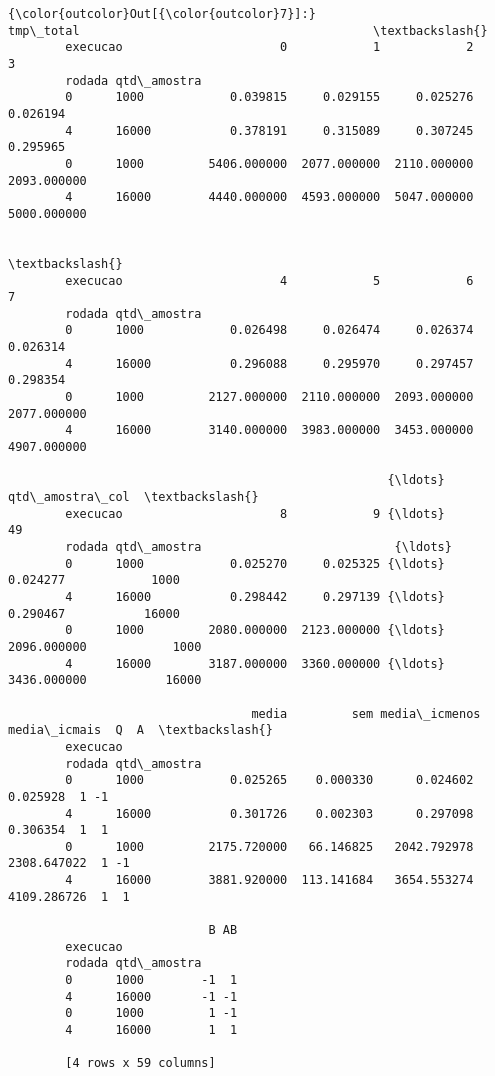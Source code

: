 \documentclass[11pt]{article}
\begin{document}
\begin{Verbatim}[commandchars=\\\{\}]
{\color{outcolor}Out[{\color{outcolor}7}]:}                       tmp\_total                                         \textbackslash{}
        execucao                      0            1            2            3   
        rodada qtd\_amostra                                                       
        0      1000            0.039815     0.029155     0.025276     0.026194   
        4      16000           0.378191     0.315089     0.307245     0.295965   
        0      1000         5406.000000  2077.000000  2110.000000  2093.000000   
        4      16000        4440.000000  4593.000000  5047.000000  5000.000000   
        
                                                                                \textbackslash{}
        execucao                      4            5            6            7   
        rodada qtd\_amostra                                                       
        0      1000            0.026498     0.026474     0.026374     0.026314   
        4      16000           0.296088     0.295970     0.297457     0.298354   
        0      1000         2127.000000  2110.000000  2093.000000  2077.000000   
        4      16000        3140.000000  3983.000000  3453.000000  4907.000000   
        
                                                     {\ldots}              qtd\_amostra\_col  \textbackslash{}
        execucao                      8            9 {\ldots}           49                   
        rodada qtd\_amostra                           {\ldots}                                
        0      1000            0.025270     0.025325 {\ldots}     0.024277            1000   
        4      16000           0.298442     0.297139 {\ldots}     0.290467           16000   
        0      1000         2080.000000  2123.000000 {\ldots}  2096.000000            1000   
        4      16000        3187.000000  3360.000000 {\ldots}  3436.000000           16000   
        
                                  media         sem media\_icmenos media\_icmais  Q  A  \textbackslash{}
        execucao                                                                       
        rodada qtd\_amostra                                                             
        0      1000            0.025265    0.000330      0.024602     0.025928  1 -1   
        4      16000           0.301726    0.002303      0.297098     0.306354  1  1   
        0      1000         2175.720000   66.146825   2042.792978  2308.647022  1 -1   
        4      16000        3881.920000  113.141684   3654.553274  4109.286726  1  1   
        
                            B AB  
        execucao                  
        rodada qtd\_amostra        
        0      1000        -1  1  
        4      16000       -1 -1  
        0      1000         1 -1  
        4      16000        1  1  
        
        [4 rows x 59 columns]
\end{Verbatim}
            
\end{document}
